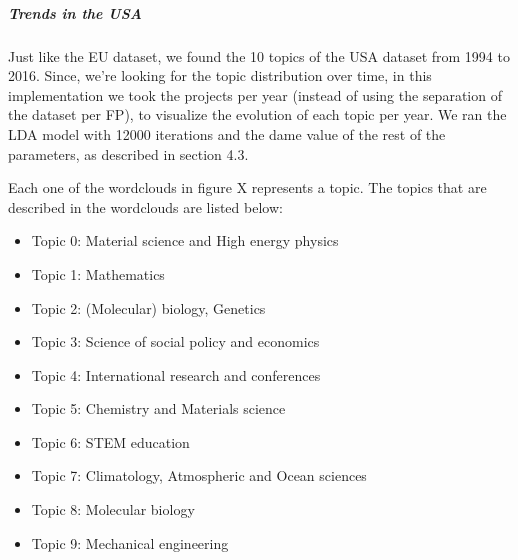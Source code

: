\documentclass[12pt]{report}
\begin{document}
\subparagraph{Trends in the USA	}

Just like the EU dataset, we found the 10 topics of the USA dataset from 1994 to
2016. Since, we're looking for the topic distribution over time, in this
implementation we took the projects per year (instead of using the separation of
the dataset per FP), to visualize the evolution of each topic per year. We ran
the LDA model with 12000 iterations and the dame value of the rest of the
parameters, as described in section 4.3.

Each one of the wordclouds in figure X represents a topic. The topics that are
described in the wordclouds are listed below:

\begin{itemize}
\item[] Topic 0: Material science and High energy physics
\item[] Topic 1: Mathematics
\item[] Topic 2: (Molecular) biology, Genetics
\item[] Topic 3: Science of social policy and economics
\item[] Topic 4: International research and conferences
\item[] Topic 5: Chemistry and Materials science
\item[] Topic 6: STEM education
\item[] Topic 7: Climatology, Atmospheric and Ocean sciences
\item[] Topic 8: Molecular biology 
\item[] Topic 9: Mechanical engineering
\end{itemize}
\end{document}
